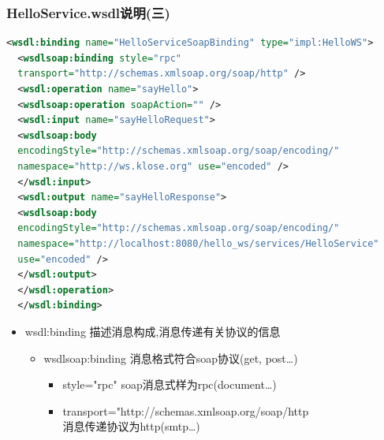 \documentclass[CJKutf8,compress,hyperref]{beamer}
\begin{document}
\begin{CJK}{UTF8}{song}
  \begin{frame}[containsverbatim] 
  \frametitle{HelloService.wsdl说明(三)} 
  \begin{lstlisting}[language=XML]
  <wsdl:binding name="HelloServiceSoapBinding" type="impl:HelloWS">
  <wsdlsoap:binding style="rpc"
  transport="http://schemas.xmlsoap.org/soap/http" />                       
  <wsdl:operation name="sayHello">
  <wsdlsoap:operation soapAction="" />                      
  <wsdl:input name="sayHelloRequest">
  <wsdlsoap:body
  encodingStyle="http://schemas.xmlsoap.org/soap/encoding/"
  namespace="http://ws.klose.org" use="encoded" />
  </wsdl:input>   
  <wsdl:output name="sayHelloResponse">
  <wsdlsoap:body
  encodingStyle="http://schemas.xmlsoap.org/soap/encoding/"
  namespace="http://localhost:8080/hello_ws/services/HelloService"
  use="encoded" />
  </wsdl:output>
  </wsdl:operation>
  </wsdl:binding>
  \end{lstlisting}
  \begin{itemize}
          \item  {\color{red}wsdl:binding} 描述消息构成,消息传递有关协议的信息
                  \begin{itemize}
                          \item {\color{red}wsdlsoap:binding} 消息格式符合soap协议(get, post\ldots)
                                  \begin{itemize}
                                          \item {\color{red}style="rpc"} soap消息式样为rpc(document\ldots)
                                          \item {\color{red} transport="http://schemas.xmlsoap.org/soap/http} \\ 消息传递协议为http(smtp\ldots)
                                  \end{itemize}
                  \end{itemize}
  \end{itemize}
  \end{frame}


\end{CJK}
\end{document}
